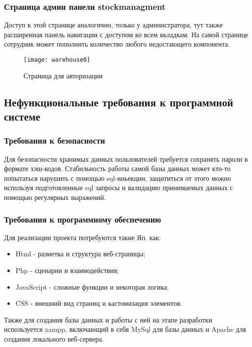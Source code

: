 \newpage

\subsubsection{Страница админ панели stockmanagment}

Доступ к этой странице аналогично, только у администратора, тут также расширенная панель навигации с доступом ко всем вкладкам. На самой странице сотрудник может пополнить количество любого недостающего компонента.

\begin{figure}[ht]
	\texttt{[image: warehouse0]}
	\caption{Страница для авторизации}
	\label{indext:warehouse0}
\end{figure}

\newpage

\subsection{Нефункциональные требования к программной системе}

\subsubsection{Требования к безопасности}
Для безопасности хранимых данных пользователей требуется сохранять пароли в формате  хэш-кодов. Стабильность работы самой базы данных может кто-то попытаться нарушить с помощью sql-иньекции, защититься от этого можно используя подготовленные sql запросы и валидацию принимаемых данных с помощью регулярных выражений.
\subsubsection{Требования к программному обеспечению}
Для реализации проекта потребуются такие Яп. как:
\begin{itemize}
	\item Html - разметка и структура веб-страницы;
	\item Php - сценарии и взаимодействия;
	\item JavaScript - сложные функции и некоторая логика;
	\item CSS - внешний вид страниц и кастомизация элементов.		
\end{itemize}

Также для создания базы данных и работы с ней на этапе разработки используется xampp, включающий в себя MySql для базы данных и Apache для создания локального веб-сервера. 


